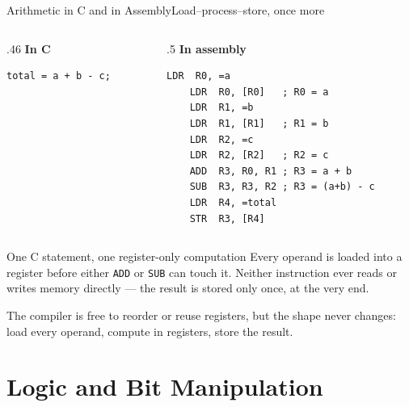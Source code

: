 \documentclass[9pt,aspectratio=169,xcolor=table]{beamer}
\begin{document}
\begin{frame}[fragile]{Arithmetic in C and in Assembly}{Load--process--store, once more}
    \begin{columns}[T]
    \begin{column}{.46\textwidth}
        \textbf{In C}

        \vspace{1mm}
        \begin{lstlisting}[style=myc]
total = a + b - c;
        \end{lstlisting}
    \end{column}
    \begin{column}{.5\textwidth}
        \textbf{In assembly}

        \vspace{1mm}
        \begin{lstlisting}[style=armasm, language=ARM]
	LDR  R0, =a
	LDR  R0, [R0]   ; R0 = a
	LDR  R1, =b
	LDR  R1, [R1]   ; R1 = b
	LDR  R2, =c
	LDR  R2, [R2]   ; R2 = c
	ADD  R3, R0, R1 ; R3 = a + b
	SUB  R3, R3, R2 ; R3 = (a+b) - c
	LDR  R4, =total
	STR  R3, [R4]
        \end{lstlisting}
    \end{column}
    \end{columns}

    \vspace{3mm}
    \begin{block}{One C statement, one register-only computation}
        Every operand is \alert{loaded} into a register before either
        \texttt{ADD} or \texttt{SUB} can touch it. Neither instruction
        ever reads or writes memory directly --- the result is
        \alert{stored} only once, at the very end.
    \end{block}

    \vspace{1mm}
    {\small The compiler is free to reorder or reuse registers, but the
    shape never changes: \alert{load every operand, compute in
    registers, store the result.}}
\end{frame}

\section{Logic and Bit Manipulation}
\end{document}
